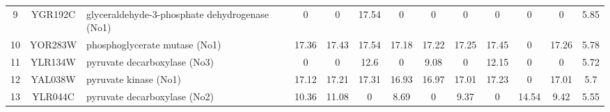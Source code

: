 \begin{table}[H]
\begin{center}
{\begin{tabular}{cclcccccccccc}
9             & YGR192C        & glyceraldehyde-3-phosphate  dehydrogenase (No1) & 0                  & 0                  & 17.54             & 0                              & 0             & 0               & 0                          & 0               & 0                 & 5.85         \\
10            & YOR283W        & phosphoglycerate mutase (No1)                   & 17.36              & 17.43              & 17.54             & 17.18                          & 17.22         & 17.25           & 17.45                      & 0               & 17.26             & 5.78         \\
11            & YLR134W        & pyruvate decarboxylase (No3)                    & 0                  & 0                  & 12.6              & 0                              & 9.08          & 0               & 12.15                      & 0               & 0                 & 5.72         \\
12            & YAL038W        & pyruvate kinase (No1)                           & 17.12              & 17.21              & 17.31             & 16.93                          & 16.97         & 17.01           & 17.23                      & 0               & 17.01             & 5.7          \\
13            & YLR044C        & pyruvate decarboxylase (No2)                    & 10.36              & 11.08              & 0                 & 8.69                           & 0             & 9.37            & 0                          & 14.54           & 9.42              & 5.55
\end{tabular}}
\label{table:cumulative_gur10_stds}
\end{center}
\end{table}
